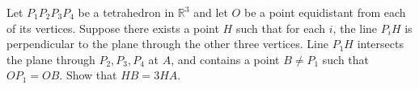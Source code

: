 Let $P_1P_2P_3P_4$ be a tetrahedron in $\mathbb{R}^3$ and let $O$ be a point equidistant from each of its vertices. Suppose there exists a point $H$ such that for each $i$,  the line $P_iH$ is perpendicular to the plane through the other three vertices. Line $P_1H$ intersects the plane through $P_2, P_3, P_4$ at $A$, and contains a point $B\neq P_1$ such that $OP_1=OB$. Show that $HB=3HA$.